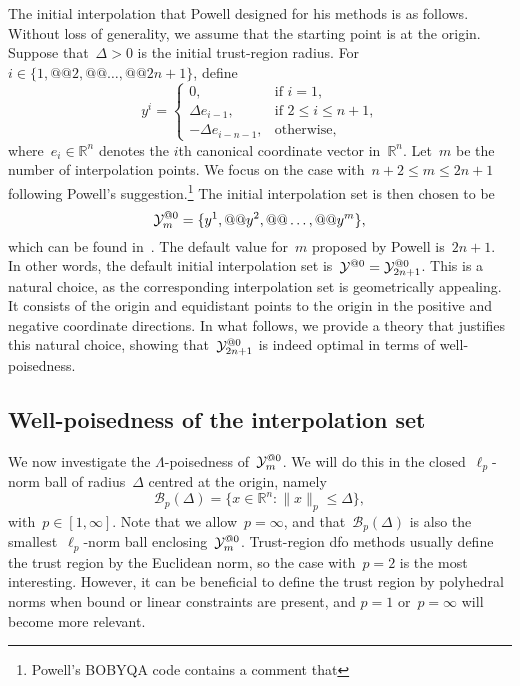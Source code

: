\documentclass{article}
\makeatletter
\newcounter{cite}
\numberwithin{equation}{section}
\theoremstyle{definition}
\theoremstyle{plain}
\theoremstyle{remark}
\newcommand*{\norm}[2][]{#1\lVert#2#1\rVert}
\newcommand*{\set}[2][]{#1\{#2#1\}}
\newcommand*{\R}{\mathbb{R}}
\newcommand*{\xpt}[1][]{\mathcal{Y}\ifblank{#1}{}{^{@#1}}}
\makeatother
\begin{document}
The initial interpolation that Powell designed for his methods is as follows.
Without loss of generality, we assume that the starting point is at the origin.
Suppose that~$\Delta > 0$ is the initial trust-region radius.
For~$i \in \set{1, @@ 2, @@ \dots, @@ 2n + 1}$, define
\begin{equation}
    \label{eq:set-def}
    y^i =
    \begin{cases}
        0,                      & \text{if~$i = 1$,}\\
        \Delta e_{i - 1},       & \text{if~$2 \le i \le n + 1$,}\\
        -\Delta e_{i - n - 1},  & \text{otherwise},
    \end{cases}
\end{equation}
where~$e_i \in \R^n$ denotes the $i$th canonical coordinate vector in~$\R^n$.
Let~$m$ be the number of interpolation points.
We focus on the case with~$n + 2 \le m \le 2n + 1$ following Powell's suggestion.\footnote{Powell's BOBYQA code contains a comment that }
The initial interpolation set is then chosen to be
\begin{equation}
    \label{eq:set-def-m}
    \xpt[0]_m = \set{y^1, @@ y^2, @@ \dots, @@ y^m},
\end{equation}
which can be found in~\cite[Equation~(3.2)]{Powell_2006}.
The default value for~$m$ proposed by Powell is~$2n + 1$.
In other words, the default initial interpolation set is~$\xpt[0] = \xpt[0]_{2n + 1}$.
This is a natural choice, as the corresponding interpolation set is geometrically appealing.
It consists of the origin and equidistant points to the origin in the positive and negative coordinate directions.
In what follows, we provide a theory that justifies this natural choice, showing that~$\xpt[0]_{2n + 1}$ is indeed optimal in terms of well-poisedness.

\subsection{Well-poisedness of the interpolation set}

We now investigate the $\Lambda$-poisedness of~$\xpt[0]_m$.
We will do this in the closed~$\ell_p$-norm ball of radius~$\Delta$ centred at the origin, namely
\begin{equation*}
    \mathcal{B}_p(\Delta) = \set{x \in \R^n : \norm{x}_p \le \Delta},
\end{equation*}
with~$p \in [1, \infty]$.
Note that we allow~$p = \infty$, and that~$\mathcal{B}_p(\Delta)$ is also the smallest~$\ell_p$-norm ball enclosing~$\xpt[0]_m$.
Trust-region \gls{dfo} methods usually define the trust region by the Euclidean norm, so the case with~$p=2$ is the most
interesting.
However, it can be beneficial to define the trust region by polyhedral norms when bound or linear constraints are present, and $p = 1$ or~$p = \infty$ will become more relevant.
\end{document}
